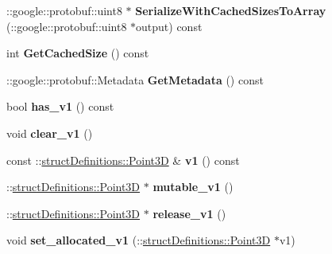 \begin{DoxyCompactItemize}
\item 
\hypertarget{classstruct_definitions_1_1_edge_a4b89f8b5afc40672e19e1b2e1bb2b4e9}{}\label{classstruct_definitions_1_1_edge_a4b89f8b5afc40672e19e1b2e1bb2b4e9} 
\+::google\+::protobuf\+::uint8 $\ast$ {\bfseries Serialize\+With\+Cached\+Sizes\+To\+Array} (\+::google\+::protobuf\+::uint8 $\ast$output) const
\item 
\hypertarget{classstruct_definitions_1_1_edge_a14e1aa9934f017d25c798f172d356316}{}\label{classstruct_definitions_1_1_edge_a14e1aa9934f017d25c798f172d356316} 
int {\bfseries Get\+Cached\+Size} () const
\item 
\hypertarget{classstruct_definitions_1_1_edge_a0f1d516c87b0c91ede3e7b6be8ec78b4}{}\label{classstruct_definitions_1_1_edge_a0f1d516c87b0c91ede3e7b6be8ec78b4} 
\+::google\+::protobuf\+::\+Metadata {\bfseries Get\+Metadata} () const
\item 
\hypertarget{classstruct_definitions_1_1_edge_af0ceb30266da3766da0ebad0a45885e6}{}\label{classstruct_definitions_1_1_edge_af0ceb30266da3766da0ebad0a45885e6} 
bool {\bfseries has\+\_\+v1} () const
\item 
\hypertarget{classstruct_definitions_1_1_edge_a271b89f08757968a3fbfadd04fe0c30e}{}\label{classstruct_definitions_1_1_edge_a271b89f08757968a3fbfadd04fe0c30e} 
void {\bfseries clear\+\_\+v1} ()
\item 
\hypertarget{classstruct_definitions_1_1_edge_a1a2fe2814a894fb04fff6c105c4438a7}{}\label{classstruct_definitions_1_1_edge_a1a2fe2814a894fb04fff6c105c4438a7} 
const \+::\hyperlink{classstruct_definitions_1_1_point3_d}{struct\+Definitions\+::\+Point3D} \& {\bfseries v1} () const
\item 
\hypertarget{classstruct_definitions_1_1_edge_a020cb36f3366f253ce4a10e8948f9d7a}{}\label{classstruct_definitions_1_1_edge_a020cb36f3366f253ce4a10e8948f9d7a} 
\+::\hyperlink{classstruct_definitions_1_1_point3_d}{struct\+Definitions\+::\+Point3D} $\ast$ {\bfseries mutable\+\_\+v1} ()
\item 
\hypertarget{classstruct_definitions_1_1_edge_abe0642edfb9b1bc2c2c67e53da25dd03}{}\label{classstruct_definitions_1_1_edge_abe0642edfb9b1bc2c2c67e53da25dd03} 
\+::\hyperlink{classstruct_definitions_1_1_point3_d}{struct\+Definitions\+::\+Point3D} $\ast$ {\bfseries release\+\_\+v1} ()
\item 
\hypertarget{classstruct_definitions_1_1_edge_a5ea586b141e11efef5a1c1a4b95178e2}{}\label{classstruct_definitions_1_1_edge_a5ea586b141e11efef5a1c1a4b95178e2} 
void {\bfseries set\+\_\+allocated\+\_\+v1} (\+::\hyperlink{classstruct_definitions_1_1_point3_d}{struct\+Definitions\+::\+Point3D} $\ast$v1)

\end{DoxyCompactItemize}
